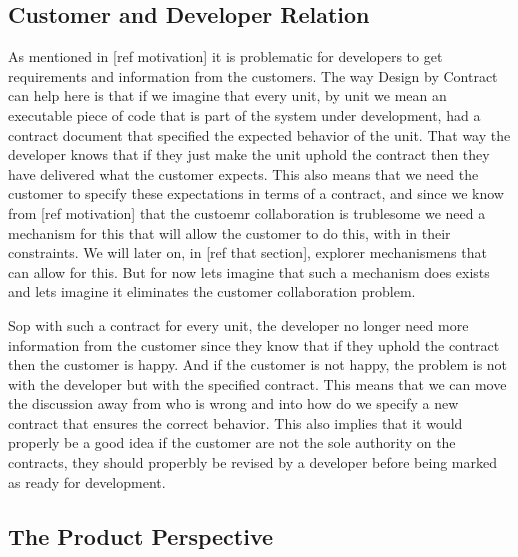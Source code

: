 \subsection{Customer and Developer Relation}
As mentioned in [ref motivation] it is problematic for developers to get requirements and information from the customers.
The way Design by Contract can help here is that if we imagine that every unit, by unit we mean an executable piece of code that is part of the system under development, had a contract document that specified the expected behavior of the unit.
That way the developer knows that if they just make the unit uphold the contract then they have delivered what the customer expects.
This also means that we need the customer to specify these expectations in terms of a contract, and since we know from [ref motivation] that the custoemr collaboration is trublesome we need a mechanism for this that will allow the customer to do this, with in their constraints. 
We will later on, in [ref that section], explorer mechanismens that can allow for this. 
But for now lets imagine that such a mechanism does exists and lets imagine it eliminates the customer collaboration problem.

Sop with such a contract for every unit, the developer no longer need more information from the customer since they know that if they uphold the contract then the customer is happy. 
And if the customer is not happy, the problem is not with the developer but with the specified contract.
This means that we can move the discussion away from who is wrong and into how do we specify a new contract that ensures the correct behavior.
This also implies that it would properly be a good idea if the customer are not the sole authority on the contracts, they should properbly be revised by a developer before being marked as ready for development.

\subsection{The Product Perspective}

